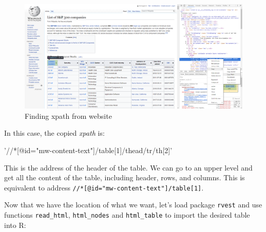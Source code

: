 \documentclass[11pt,]{book}
\newenvironment{Shaded}{\begin{snugshade}}{\end{snugshade}}
\newcommand{\KeywordTok}[1]{\textcolor[rgb]{0.27,0.27,0.27}{\textbf{#1}}}
\newcommand{\DataTypeTok}[1]{\textcolor[rgb]{0.27,0.27,0.27}{#1}}
\newcommand{\DecValTok}[1]{\textcolor[rgb]{0.06,0.06,0.06}{#1}}
\newcommand{\StringTok}[1]{\textcolor[rgb]{0.5,0.5,0.5}{#1}}
\newcommand{\CommentTok}[1]{\textcolor[rgb]{0.56,0.35,0.01}{\textit{#1}}}
\newcommand{\NormalTok}[1]{#1}
\begin{document}
\begin{figure}[!htbp]

{\centering \includegraphics[width=0.75\linewidth]{figs/SP500-Wikipedia_webscraping} 

}

\caption{Finding xpath from website}\label{fig:SP500-Wikipedia-webscraping}
\end{figure}

In this case, the copied \emph{xpath} is:

\begin{Shaded}
\begin{Highlighting}[]
\StringTok{'//*[@id="mw-content-text"]/table[1]/thead/tr/th[2]'}
\end{Highlighting}
\end{Shaded}

This is the address of the header of the table. We can go to an upper
level and get all the content of the table, including header, rows, and
columns. This is equivalent to address
\texttt{//*{[}@id="mw-content-text"{]}/table{[}1{]}}.

Now that we have the location of what we want, let's load package
\texttt{rvest} \citep{rvest} and use functions \texttt{read\_html},
\texttt{html\_nodes} and \texttt{html\_table} to import the desired
table into R:  
 

\begin{Shaded}
\end{Shaded}
\end{document}
